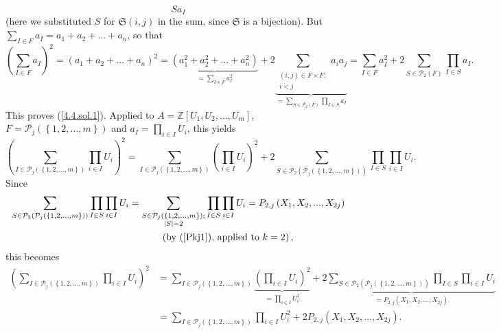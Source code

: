 \documentclass[numbers=enddot,12pt,final,onecolumn,notitlepage]{scrartcl}%
\begin{document}
{\[{S}a_{I}%
\]
(here we substituted $S$ for $\mathfrak{S}\left(  i,j\right)  $ in the sum,
since $\mathfrak{S}$ is a bijection). But $\sum\limits_{I\in F}a_{I}%
=a_{1}+a_{2}+...+a_{n}$, so that%
\[
\left(  \sum\limits_{I\in F}a_{I}\right)  ^{2}=\left(  a_{1}+a_{2}%
+...+a_{n}\right)  ^{2}=\underbrace{\left(  a_{1}^{2}+a_{2}^{2}+...+a_{n}%
^{2}\right)  }_{=\sum\limits_{I\in F}a_{I}^{2}}+2\underbrace{\sum
\limits_{\substack{\left(  i,j\right)  \in F\times F;\\i<j}}a_{i}a_{j}}%
_{=\sum\limits_{S\in\mathcal{P}_{2}\left(  F\right)  }\prod\limits_{I\in
S}a_{I}}=\sum\limits_{I\in F}a_{I}^{2}+2\sum\limits_{S\in\mathcal{P}%
_{2}\left(  F\right)  }\prod\limits_{I\in S}a_{I}.
\]
This proves (\ref{4.4.sol.1}).} Applied to $A=\mathbb{Z}\left[  U_{1}%
,U_{2},...,U_{m}\right]  $, $F=\mathcal{P}_{j}\left(  \left\{
1,2,...,m\right\}  \right)  $ and $a_{I}=\prod\limits_{i\in I}U_{i}$, this
yields%
\[
\left(  \sum\limits_{I\in\mathcal{P}_{j}\left(  \left\{  1,2,...,m\right\}
\right)  }\prod\limits_{i\in I}U_{i}\right)  ^{2}=\sum\limits_{I\in
\mathcal{P}_{j}\left(  \left\{  1,2,...,m\right\}  \right)  }\left(
\prod\limits_{i\in I}U_{i}\right)  ^{2}+2\sum\limits_{S\in\mathcal{P}%
_{2}\left(  \mathcal{P}_{j}\left(  \left\{  1,2,...,m\right\}  \right)
\right)  }\prod\limits_{I\in S}\prod\limits_{i\in I}U_{i}.
\]
Since
\begin{align*}
\sum\limits_{S\in\mathcal{P}_{2}\left(  \mathcal{P}_{j}\left(  \left\{
1,2,...,m\right\}  \right)  \right)  }\prod\limits_{I\in S}\prod\limits_{i\in
I}U_{i}  &  =\sum\limits_{\substack{S\in\mathcal{P}_{j}\left(  \left\{
1,2,...,m\right\}  \right)  ;\\\left\vert S\right\vert =2}}\prod\limits_{I\in
S}\prod\limits_{i\in I}U_{i}=P_{2,j}\left(  X_{1},X_{2},...,X_{2j}\right) \\
&  \ \ \ \ \ \ \ \ \ \ \left(  \text{by (\ref{Pkj1}), applied to }k=2\right)
,
\end{align*}
this becomes%
\begin{align*}
\left(  \sum\limits_{I\in\mathcal{P}_{j}\left(  \left\{  1,2,...,m\right\}
\right)  }\prod\limits_{i\in I}U_{i}\right)  ^{2}  &  =\sum\limits_{I\in
\mathcal{P}_{j}\left(  \left\{  1,2,...,m\right\}  \right)  }%
\underbrace{\left(  \prod\limits_{i\in I}U_{i}\right)  ^{2}}_{=\prod
\limits_{i\in I}U_{i}^{2}}+2\underbrace{\sum\limits_{S\in\mathcal{P}%
_{2}\left(  \mathcal{P}_{j}\left(  \left\{  1,2,...,m\right\}  \right)
\right)  }\prod\limits_{I\in S}\prod\limits_{i\in I}U_{i}}_{=P_{2,j}\left(
X_{1},X_{2},...,X_{2j}\right)  }\\
&  =\sum\limits_{I\in\mathcal{P}_{j}\left(  \left\{  1,2,...,m\right\}
\right)  }\prod\limits_{i\in I}U_{i}^{2}+2P_{2,j}\left(  X_{1},X_{2}%
,...,X_{2j}\right)  .
\end{align*}
\end{document}
